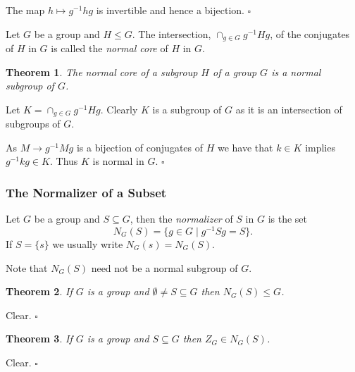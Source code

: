 \documentclass[10pt]{article}
\newtheorem{theorem}{Theorem}[section]
\newenvironment{proof}[1][Proof]{\begin{trivlist}
\item[\hskip \labelsep {\itshape #1}]}{\end{trivlist}}
\newenvironment{definition}[1][Definition]{\begin{trivlist}
\item[\hskip \labelsep {\bfseries #1}]}{\end{trivlist}}
\begin{document}
\begin{proof}
The map $h \mapsto g^{-1}hg$ is invertible and hence a bijection. $\square$
\end{proof}

\begin{definition}
Let $G$ be a group and $H \leq G$. The intersection, $\cap_{g \in G} g^{-1}Hg$, of the conjugates of $H$ in $G$ is called the \emph{normal core} of $H$ in $G$.
\end{definition}

\begin{theorem}
The normal core of a subgroup $H$ of a group $G$ is a normal subgroup of $G$.
\end{theorem}

\begin{proof}
Let $K = \cap_{g \in G} g^{-1}Hg$. Clearly $K$ is a subgroup of $G$ as it is an intersection of subgroups of $G$.

As $M \to g^{-1}Mg$ is a bijection of conjugates of $H$ we have that $k \in K$ implies $g^{-1}kg \in K$. Thus $K$ is normal in $G$. $\square$
\end{proof}

\subsubsection{The Normalizer of a Subset}

\begin{definition}
Let $G$ be a group and $S \subseteq G$, then the \emph{normalizer} of $S$ in $G$ is the set
$$N_G(S) = \{g \in G \;|\; g^{-1}Sg = S\}.$$
If $S = \{s\}$ we usually write $N_G(s) = N_G(S)$.
\end{definition}

Note that $N_G(S)$ need not be a normal subgroup of $G$.

\begin{theorem}
If $G$ is a group and $\emptyset \neq S \subseteq G$ then $N_G(S) \leq G$.
\end{theorem}

\begin{proof}
Clear. $\square$
\end{proof}

\begin{theorem}
If $G$ is a group and $S \subseteq G$ then $Z_G \in N_G(S)$.
\end{theorem}

\begin{proof}
Clear. $\square$
\end{proof}
\end{document}

